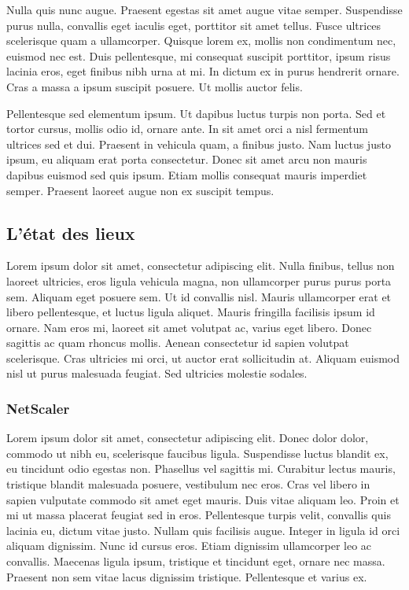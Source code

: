 \documentclass[a4paper,12pt]{report}
\begin{document}
Nulla quis nunc augue. Praesent egestas sit amet augue vitae semper. Suspendisse purus nulla, convallis eget iaculis eget, porttitor sit amet tellus. Fusce ultrices scelerisque quam a ullamcorper. Quisque lorem ex, mollis non condimentum nec, euismod nec est. Duis pellentesque, mi consequat suscipit porttitor, ipsum risus lacinia eros, eget finibus nibh urna at mi. In dictum ex in purus hendrerit ornare. Cras a massa a ipsum suscipit posuere. Ut mollis auctor felis.

Pellentesque sed elementum ipsum. Ut dapibus luctus turpis non porta. Sed et tortor cursus, mollis odio id, ornare ante. In sit amet orci a nisl fermentum ultrices sed et dui. Praesent in vehicula quam, a finibus justo. Nam luctus justo ipsum, eu aliquam erat porta consectetur. Donec sit amet arcu non mauris dapibus euismod sed quis ipsum. Etiam mollis consequat mauris imperdiet semper. Praesent laoreet augue non ex suscipit tempus.


\subsection{L'état des lieux} %

Lorem ipsum dolor sit amet, consectetur adipiscing elit. Nulla finibus, tellus non laoreet ultricies, eros ligula vehicula magna, non ullamcorper purus purus porta sem. Aliquam eget posuere sem. Ut id convallis nisl. Mauris ullamcorper erat et libero pellentesque, et luctus ligula aliquet. Mauris fringilla facilisis ipsum id ornare. Nam eros mi, laoreet sit amet volutpat ac, varius eget libero. Donec sagittis ac quam rhoncus mollis. Aenean consectetur id sapien volutpat scelerisque. Cras ultricies mi orci, ut auctor erat sollicitudin at. Aliquam euismod nisl ut purus malesuada feugiat. Sed ultricies molestie sodales.

\subsubsection{NetScaler} %
Lorem ipsum dolor sit amet, consectetur adipiscing elit. Donec dolor dolor, commodo ut nibh eu, scelerisque faucibus ligula. Suspendisse luctus blandit ex, eu tincidunt odio egestas non. Phasellus vel sagittis mi. Curabitur lectus mauris, tristique blandit malesuada posuere, vestibulum nec eros. Cras vel libero in sapien vulputate commodo sit amet eget mauris. Duis vitae aliquam leo. Proin et mi ut massa placerat feugiat sed in eros. Pellentesque turpis velit, convallis quis lacinia eu, dictum vitae justo. Nullam quis facilisis augue. Integer in ligula id orci aliquam dignissim. Nunc id cursus eros. Etiam dignissim ullamcorper leo ac convallis. Maecenas ligula ipsum, tristique et tincidunt eget, ornare nec massa. Praesent non sem vitae lacus dignissim tristique. Pellentesque et varius ex.
\end{document}
